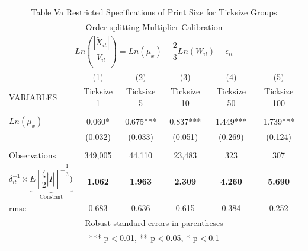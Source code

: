 \documentclass[12pt,a4paper]{article}
\begin{document}
\newpage
\begin{landscape}
\begin{table}
\begin{center}
\begin{tabular}{lccccc}
\multicolumn{6}{c}{Table Va Restricted Specifications of Print Size for Ticksize Groups} \\ 
\multicolumn{6}{c}{Order-splitting Multiplier Calibration} \\
\hline
\multicolumn{6}{c}{$Ln(\dfrac{|\tilde{X}_{it}|}{V_{it}}) = Ln(\mu_{x}) - \dfrac{2}{3} Ln(W_{it}) + \epsilon_{it}$} \\
 & (1) & (2) & (3) & (4) & (5) \\
VARIABLES & Ticksize 1 & Ticksize 5 & Ticksize 10 & Ticksize 50 & Ticksize 100 \\ \hline
 &  &  &  &  &  \\
$Ln(\mu_{x})$ & 0.060* & 0.675*** & 0.837*** & 1.449*** & 1.739*** \\
 & (0.032) & (0.033) & (0.051) & (0.269) & (0.124) \\
 &  &  &  &  &  \\
Observations & 349,005 & 44,110 & 23,483 & 323 & 307 \\
$\delta_{it}^{-1} \times \underbrace{E[\dfrac{\zeta}{2}|\tilde{I}|]^{-\dfrac{1}{3}})}_{\text{Constant}}$ & \textbf{1.062} & \textbf{1.963} & \textbf{2.309} & \textbf{4.260} & \textbf{5.690} \\
 rmse & 0.683 & 0.636 & 0.615 & 0.384 & 0.252 \\ \hline
\multicolumn{6}{c}{ Robust standard errors in parentheses} \\
\multicolumn{6}{c}{ *** p$<$0.01, ** p$<$0.05, * p$<$0.1} \\
\end{tabular}
\end{center}
\end{table}
\end{landscape}
\end{document}
